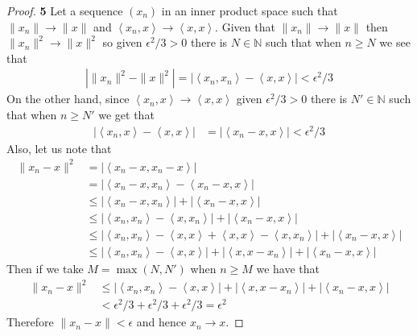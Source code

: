\documentclass[11pt]{article}
\newcommand{\N}{\mathbb{N}}
\newcommand{\inprd}[1]{\left\langle{#1}\right\rangle}
\theoremstyle{definition}
\begin{document}
\cleardoublepage
\begin{proof}{\textbf{5}}
Let a sequence $(x_n)$ in an inner product space such that
$\|x_n\| \to \|x\|$ and $\inprd{x_n, x} \to \inprd{x, x}$.
Given that $\|x_n\| \to \|x\|$ then $\|x_n\|^2 \to \|x\|^2$ so given
$\epsilon^2/3 > 0$ there is $N \in \N$ such that when $n \geq N$ we see that
\begin{align*}
    |\|x_n\|^2 - \|x\|^2| = |\inprd{x_n, x_n} - \inprd{x,x}| < \epsilon^2/3
\end{align*}
On the other hand, since $\inprd{x_n, x} \to \inprd{x, x}$ given $\epsilon^2/3 > 0$
there is $N' \in \N$ such that when $n \geq N'$ we get that
\begin{align*}
    |\inprd{x_n, x} - \inprd{x,x}| &= |\inprd{x_n - x, x}| < \epsilon^2/3
\end{align*}
Also, let us note that
\begin{align*}
    \|x_n - x\|^2 &= |\inprd{x_n - x, x_n - x}|\\
    &= |\inprd{x_n - x, x_n} - \inprd{x_n - x, x}|\\
    &\leq |\inprd{x_n - x, x_n}| + |\inprd{x_n - x, x}|\\
    &\leq |\inprd{x_n, x_n} - \inprd{x, x_n}| + |\inprd{x_n - x, x}|\\
    &\leq |\inprd{x_n, x_n} - \inprd{x,x} + \inprd{x,x} - \inprd{x, x_n}| + |\inprd{x_n - x, x}|\\
    &\leq |\inprd{x_n, x_n} - \inprd{x,x}| + |\inprd{x, x - x_n}| + |\inprd{x_n - x, x}|
\end{align*}
Then if we take $M = \max(N, N')$ when $n \geq M$ we have that
\begin{align*}
    \|x_n - x\|^2 
    &\leq |\inprd{x_n, x_n} - \inprd{x,x}| + |\inprd{x, x - x_n}| + |\inprd{x_n - x, x}|\\
    & < \epsilon^2/3 + \epsilon^2/3 + \epsilon^2/3 = \epsilon^2 
\end{align*}
Therefore $\|x_n - x\| < \epsilon$ and hence $x_n \to x$.
\end{proof}
\end{document}
